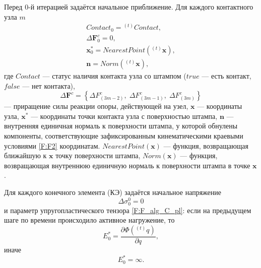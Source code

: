 Перед $0$-й итерацией задаётся начальное приближение. Для каждого контактного узла $m$
\begin{equation}
\begin{gathered}
Contact_0={}^{(t)}Contact,\\
\Delta\mathbf{F}_0^c=0,\\
\mathbf{x}_0^*=NearestPoint \left({}^{(t)}\mathbf{x}\right),\\
\mathbf{n}=Norm\left({}^{(t)}\mathbf{x}\right),
\label{F:F_alg_contact_nach}
\end{gathered}
\end{equation}
где $Contact$ --- статус наличия контакта узла со штампом ($true$ --- есть контакт, $false$ --- нет контакта),
\begin{equation}
\Delta\mathbf{F}^c=\left\lbrace \Delta F_{\left( 3m-2\right) }^{c},\;\Delta F_{\left( 3m-1\right) }^{c},\;\Delta F_{\left( 3m\right) }^{c}\right\rbrace
\label{F:F_alg_deltaF}
\end{equation}
--- приращение силы реакции опоры, действующей на узел, $\mathbf{x}$ --- координаты узла, $\mathbf{x}^*$ --- координаты точки контакта узла с поверхностью штампа, $\mathbf{n}$ --- внутренняя единичная нормаль к поверхности штампа, у которой обнулены компоненты, соответствующие зафиксированным кинематическими краевыми условиями \eqref{F:F2} координатам. $NearestPoint \left(\mathbf{x}\right)$ --- функция, возвращающая ближайшую к $\mathbf{x}$ точку поверхности штампа, $Norm \left(\mathbf{x}\right)$ --- функция, возвращающая внутреннюю единичную нормаль к поверхности штампа в точке $\mathbf{x}$.

Для каждого конечного элемента (КЭ) задаётся начальное напряжение
\begin{equation}
\Delta\sigma_0^0=0
\label{F:F_alg_ep_nach1}
\end{equation}
и параметр упругопластического тензора \eqref{F:F_alg_C_pl}: если на предыдущем шаге по времени происходило активное нагружение, то
\begin{equation}
E_0^*=\frac{\partial\Phi\left({}^{(t)}q\right)}{\partial q},
\label{F:F_alg_ep_nach2}
\end{equation}
иначе
\begin{equation}
E_0^*=\infty.
\label{F:F_alg_ep_nach3}
\end{equation}

